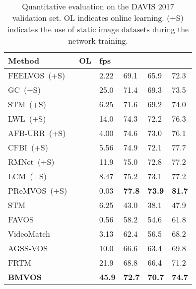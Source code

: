 \documentclass[10pt,twocolumn,letterpaper]{article}
\begin{document}
	
	
	\begin{table}
		\centering 
		\caption{Quantitative evaluation on the DAVIS 2017 validation set. OL indicates online learning. (+S) indicates the use of static image datasets during the network training.}
		\vspace{2mm}
		\small
		\begin{tabular}{lP{0.58cm}P{0.58cm}P{0.58cm}P{0.58cm}P{0.58cm}}
			\toprule
			Method &OL &fps & & &\\
			\midrule
			FEELVOS~(+S)~\cite{FEELVOS} & &2.22 &69.1 &65.9 &72.3\\
			GC~(+S)~\cite{GC} & &25.0 &71.4 &69.3 &73.5\\
			STM~(+S)~\cite{STM} & &6.25 &71.6 &69.2 &74.0\\
			LWL~(+S)~\cite{LWL} &\checkmark &14.0 &74.3 &72.2 &76.3\\
			AFB-URR~(+S)~\cite{AFB-URR} & &4.00 &74.6 &73.0 &76.1\\
			CFBI~(+S)~\cite{CFBI} & &5.56 &74.9 &72.1 &77.7\\
			RMNet~(+S)~\cite{RMNet} & &11.9 &75.0 &72.8 &77.2\\
			LCM~(+S)~\cite{LCM} & &8.47 &75.2 &73.1 &77.2\\
			PReMVOS~(+S)~\cite{PReMVOS} &\checkmark &0.03 &\textbf{77.8} &\textbf{73.9} &\textbf{81.7}\\
			\midrule
			STM~\cite{STM} & &6.25 &43.0 &38.1 &47.9\\
			FAVOS~\cite{FAVOS} & &0.56 &58.2 &54.6 &61.8\\
			VideoMatch~\cite{VideoMatch} & &3.13 &62.4 &56.5 &68.2\\
			AGSS-VOS~\cite{AGSS-VOS} & &10.0 &66.6 &63.4 &69.8\\
			FRTM~\cite{FRTM} &\checkmark &21.9 &68.8 &66.4 &71.2\\
			\midrule
			\textbf{BMVOS} & &\textbf{45.9} &\textbf{72.7} &\textbf{70.7} &\textbf{74.7}\\
			\bottomrule
		\end{tabular}
		\label{Table:DAVIS17_val}
	\end{table}
	
\end{document}
